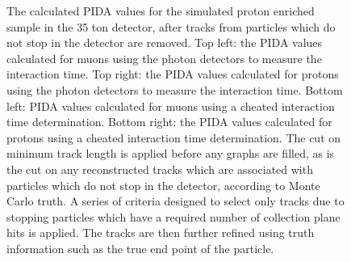 \begin{figure}
\begin{subfigure}{0.48\textwidth}
        \label{fig:CRY_PIDACheat_Muon_Cheat}
  \end{subfigure}
  \caption[The calculated PIDA values for the simulated proton enriched sample in the 35 ton detector, after tracks from particles which do not stop in the detector are removed]
          {The calculated PIDA values for the simulated proton enriched sample in the 35 ton detector, after tracks from particles which do not stop in the detector are removed. Top left: the PIDA values calculated for muons using the photon detectors to measure the interaction time. Top right: the PIDA values calculated for protons using the photon detectors to measure the interaction time. Bottom left: PIDA values calculated for muons using a cheated interaction time determination. Bottom right: the PIDA values calculated for protons using a cheated interaction time determination. The cut on minimum track length is applied before any graphs are filled, as is the cut on any reconstructed tracks which are associated with particles which do not stop in the detector, according to Monte Carlo truth. A series of criteria designed to select only tracks due to stopping particles which have a required number of collection plane hits is applied. The tracks are then further refined using truth information such as the true end point of the particle.}
  \label{fig:CRY_PIDACheat}
\end{figure}

